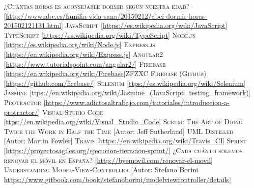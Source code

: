 \documentclass[openany]{book}
\begin{document}
\begin{thebibliography}{References}
 \textsc{¿Cuántas horas es aconsejable dormir según nuestra edad?} [\url{http://www.abc.es/familia-vida-sana/20150212/abci-dormir-horas-201502121131.html}]
 \textsc{JavaScript} [\url{https://es.wikipedia.org/wiki/JavaScript}]
 \textsc{TypeScript} [\url{https://es.wikipedia.org/wiki/TypeScript}]
 \textsc{Node.js} [\url{https://es.wikipedia.org/wiki/Node.js}]
 \textsc{Express.js} [\url{https://en.wikipedia.org/wiki/Express.js}]
 \textsc{Angular2} [\url{https://www.tutorialspoint.com/angular2/}]
 \textsc{Firebase} [\url{https://en.wikipedia.org/wiki/Firebase}]ZFZXC
 \textsc{Firebase (Github)} [\url{https://github.com/firebase/}]
 \textsc{Selenium} [\url{ttps://es.wikipedia.org/wiki/Selenium}]
 \textsc{Jasmine} [\url{ttps://en.wikipedia.org/wiki/Jasmine_(JavaScript_testing_framework)}]
 \textsc{Protractor} [\url{https://www.adictosaltrabajo.com/tutoriales/introduccion-a-protractor/}]
 \textsc{Visual Studio Code} [\url{ttps://en.wikipedia.org/wiki/Visual_Studio_Code}]
 \textsc{Scrum: The Art of Doing Twice the Work in Half the Time} [Autor: Jeff Sutherland]
 \textsc{UML Distilled} [Autor: Martin Fowler]
 \textsc{Travis} [\url{https://en.wikipedia.org/wiki/Travis_CI}]
 \textsc{Sprint} [\url{https://proyectosagiles.org/ejecucion-iteracion-sprint/}]
 \textsc{¿Cada cuánto solemos renovar el móvil en España?} [\url{http://byemovil.com/renovar-el-movil}]
 \textsc{Understanding Model-View-Controller} [Autor: Stefano Borini \url{https://www.gitbook.com/book/stefanoborini/modelviewcontroller/details}]

\end{thebibliography}
\end{document}
